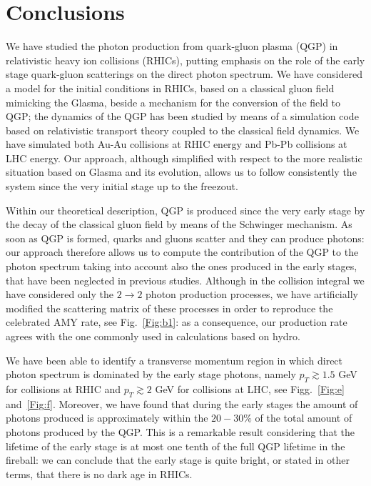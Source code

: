 \documentclass[aps,prc,a4paper,nofootinbib,
preprintnumbers,superscriptaddress,twocolumn,showpacs,showkeys]{revtex4}
\begin{document}
\section{Conclusions}
We have studied the photon production from quark-gluon plasma (QGP)
in relativistic heavy ion collisions (RHICs), putting emphasis on the role of the 
early stage quark-gluon scatterings on the direct photon spectrum.
We have considered a model for the initial conditions in RHICs,
based on a classical gluon field mimicking the Glasma, beside a mechanism for the conversion
of the field to QGP; the dynamics of the QGP 
has been studied by means of a simulation code based  on relativistic transport theory
coupled to the classical field dynamics. We have simulated
both Au-Au collisions at RHIC energy and Pb-Pb collisions at LHC energy.
Our approach, although simplified with respect to the more realistic situation based
on Glasma and its evolution,
allows us to follow consistently the system since the very initial stage up to the freezout.

Within our theoretical description,
QGP is produced since the very early stage by the decay of the classical gluon field by means of the
Schwinger mechanism. As soon as QGP is formed, 
quarks and gluons scatter and they can produce photons: our approach therefore allows us
to compute the contribution of the QGP to the photon spectrum taking into account
also the ones produced in the early stages, that have been neglected in previous studies.
Although in the collision integral we have considered only the $2\rightarrow 2$ 
photon production processes, we have artificially modified the scattering matrix of these 
processes in order to reproduce the celebrated AMY rate, see Fig.~\ref{Fig:b1}:
as a consequence, 
our production rate agrees with the one commonly used in calculations based on hydro.

We have been able to identify a transverse momentum region 
in which direct photon spectrum is dominated by the early stage photons,
namely $p_T \gtrsim 1.5$ GeV for collisions at RHIC and 
$p_T \gtrsim 2$ GeV for collisions at LHC, see Figg.~\ref{Fig:e} and~\ref{Fig:f}.
Moreover, we have found that during the early stages the amount of photons
produced is approximately within the $20-30\%$ of the total amount of photons produced
by the QGP. This is a remarkable result considering that
the lifetime of the early stage is at most one tenth of the full QGP lifetime in the fireball:
we can conclude that the early stage is quite bright, or stated in other terms, 
that there is no dark age in RHICs.
\end{document}
